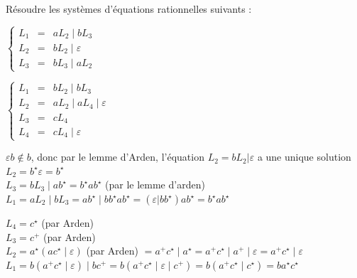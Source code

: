 
\begingroup

\begin{exercice}\label{exo:lexing/arden/arden}

  Résoudre les systèmes d'équations rationnelles suivants :
  \begin{questions}
  \item $\left\{\begin{array}{rcl}
    L_1 &=& aL_2 \mid  bL_3 \\
    L_2 &=& bL_2 \mid  \varepsilon \\
    L_3 &=& bL_3 \mid  aL_2
  \end{array}\right.$
  \item $\left\{\begin{array}{rcl}
    L_1 &=& bL_2 \mid  bL_3 \\
    L_2 &=& aL_2 \mid  aL_4 \mid  \varepsilon \\
    L_3 &=& cL_4 \\
    L_4 &=& cL_4 \mid  \varepsilon
  \end{array}\right.$
  \end{questions}

\end{exercice}

\begin{corrections}

  \begin{questions}
  \item
    $\varepsilon b\notin b$, donc par le lemme d'Arden, l'équation
    $L_2 = b L_2 | \varepsilon$ a une unique solution $L_2 = b^\star \varepsilon = b^\star$\\
    $L_3 = bL_3 \mid  ab^\star  = b^\star  ab^\star $ (par le lemme d'arden)\\
    $L_1 = aL_2 \mid  bL_3 = ab^\star  \mid  bb^\star  ab^\star  = (\varepsilon |bb^\star ) ab^\star = b^\star  ab^\star $
  \item
    $L_4 = c^\star $ (par Arden)\\
    $L_3 = c^+$ (par Arden)\\
    $L_2 = a^\star (ac^\star  \mid  \varepsilon)$ (par Arden) $= a^+c^\star  \mid  a^\star  = a^+c^\star  \mid  a^+ \mid  \varepsilon = a^+c^\star  \mid  \varepsilon$\\
    $L_1 = b(a^+c^\star  \mid  \varepsilon) \mid  bc^+ = b(a^+c^\star  \mid  \varepsilon \mid  c^+) = b(a^+c^\star  \mid  c^\star ) = ba^\star  c^\star $
  \end{questions}

\end{corrections}

\endgroup
\endinput
